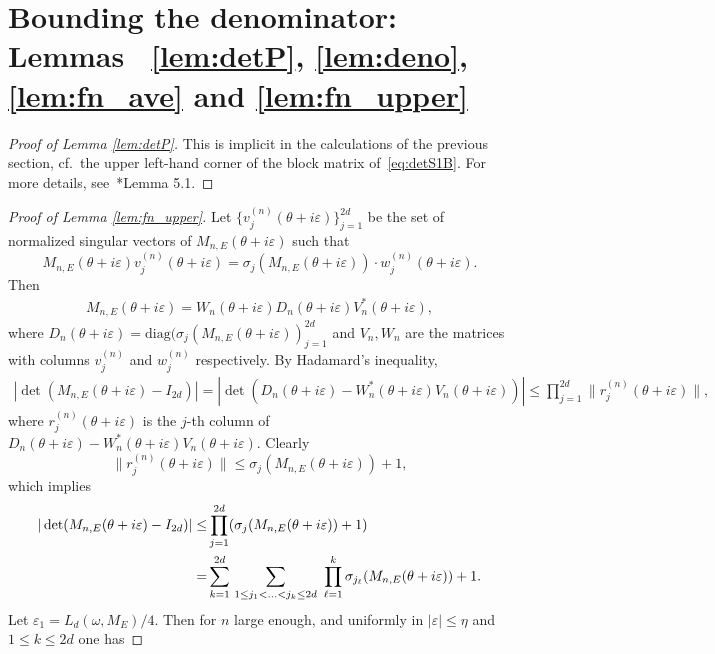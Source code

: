 \documentclass[11pt]{amsart}
\begin{document}
\section{Bounding the denominator: Lemmas~ \ref{lem:detP}, \ref{lem:deno}, \ref{lem:fn_ave} and \ref{lem:fn_upper}}
\label{sec:nenner}

\begin{proof}[Proof of Lemma \ref{lem:detP}]
    This is implicit in the calculations of the previous section, cf.~the upper left-hand corner of the block matrix of~\eqref{eq:detS1B}. For more details, see~\cite{HS3}*{Lemma 5.1}. 
\end{proof}


\begin{proof}[Proof of Lemma \ref{lem:fn_upper}]
    Let $\{v_{j}^{(n)}(\theta+i\varepsilon)\}_{j=1}^{2d}$ be the set of normalized singular vectors of $M_{n,E}(\theta+i\varepsilon)$ such that 
    \[M_{n,E}(\theta+i\varepsilon) v_j^{(n)}(\theta+i\varepsilon)=\sigma_j(M_{n,E}(\theta+i\varepsilon)) \cdot w_j^{(n)}(\theta+i\varepsilon).\]
    Then 
    \begin{align}\label{eq:Mn_singular_decom}
    M_{n,E}(\theta+i\varepsilon)=W_n(\theta+i\varepsilon)D_n(\theta+i\varepsilon)V_n^*(\theta+i\varepsilon),
    \end{align}
    where $D_n(\theta+i\varepsilon)=\mathrm{diag}(\sigma_j(M_{n,E}(\theta+i\varepsilon))_{j=1}^{2d}$ and $V_n,W_n$ are the matrices with columns $v_j^{(n)}$ and $w_j^{(n)}$ respectively.
    By Hadamard's inequality,
    \begin{align}
        |\det(M_{n,E}(\theta+i\varepsilon)-I_{2d})|=|\det (D_n(\theta+i\varepsilon)-W_n^*(\theta+i\varepsilon)V_n(\theta+i\varepsilon))|\leq \prod_{j=1}^{2d}\|r_j^{(n)}(\theta+i\varepsilon)\|,
    \end{align}
    where $r_j^{(n)}(\theta+i\varepsilon)$ is the $j$-th column of $D_n(\theta+i\varepsilon)-W_n^*(\theta+i\varepsilon)V_n(\theta+i\varepsilon)$.
    Clearly 
    \[\|r_j^{(n)}(\theta+i\varepsilon)\|\leq \sigma_j(M_{n,E}(\theta+i\varepsilon))+1,\] 
    which implies
    \begin{align}\label{eq:detM-I_upper}
        |\det(M_{n,E}(\theta+i\varepsilon)-I_{2d})|
        \leq &\prod_{j=1}^{2d}(\sigma_j(M_{n,E}(\theta+i\varepsilon))+1) \notag\\
        =&\sum_{k=1}^{2d}\, \sum_{1\leq j_1<...<j_{k}\leq 2d}\,\, \prod_{\ell=1}^{k} \sigma_{j_{\ell}}(M_{n,E}(\theta+i\varepsilon))+1.
    \end{align}
Let $\varepsilon_1=L_d(\omega,M_E)/4$. Then for $n$ large enough, and uniformly in $|\varepsilon|\leq \eta$ and $1\leq k\leq 2d$ one has

\end{proof}
\end{document}

